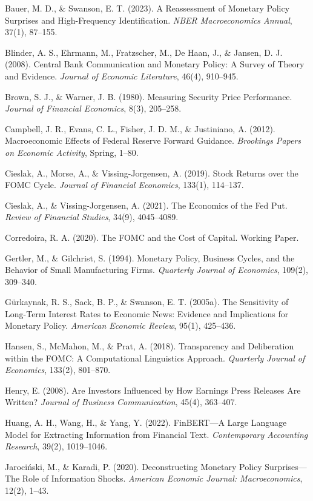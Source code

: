 \documentclass[12pt]{article}
\begin{document}
Bauer, M. D., & Swanson, E. T. (2023). A Reassessment of Monetary Policy Surprises and High-Frequency Identification. \textit{NBER Macroeconomics Annual}, 37(1), 87–155.

Blinder, A. S., Ehrmann, M., Fratzscher, M., De Haan, J., & Jansen, D. J. (2008). Central Bank Communication and Monetary Policy: A Survey of Theory and Evidence. \textit{Journal of Economic Literature}, 46(4), 910–945.

Brown, S. J., & Warner, J. B. (1980). Measuring Security Price Performance. \textit{Journal of Financial Economics}, 8(3), 205–258.

Campbell, J. R., Evans, C. L., Fisher, J. D. M., & Justiniano, A. (2012). Macroeconomic Effects of Federal Reserve Forward Guidance. \textit{Brookings Papers on Economic Activity}, Spring, 1–80.

Cieslak, A., Morse, A., & Vissing-Jorgensen, A. (2019). Stock Returns over the FOMC Cycle. \textit{Journal of Financial Economics}, 133(1), 114–137.

Cieslak, A., & Vissing-Jorgensen, A. (2021). The Economics of the Fed Put. \textit{Review of Financial Studies}, 34(9), 4045–4089.

Corredoira, R. A. (2020). The FOMC and the Cost of Capital. Working Paper.

Gertler, M., & Gilchrist, S. (1994). Monetary Policy, Business Cycles, and the Behavior of Small Manufacturing Firms. \textit{Quarterly Journal of Economics}, 109(2), 309–340.

Gürkaynak, R. S., Sack, B. P., & Swanson, E. T. (2005a). The Sensitivity of Long-Term Interest Rates to Economic News: Evidence and Implications for Monetary Policy. \textit{American Economic Review}, 95(1), 425–436.

Hansen, S., McMahon, M., & Prat, A. (2018). Transparency and Deliberation within the FOMC: A Computational Linguistics Approach. \textit{Quarterly Journal of Economics}, 133(2), 801–870.

Henry, E. (2008). Are Investors Influenced by How Earnings Press Releases Are Written? \textit{Journal of Business Communication}, 45(4), 363–407.

Huang, A. H., Wang, H., & Yang, Y. (2022). FinBERT---A Large Language Model for Extracting Information from Financial Text. \textit{Contemporary Accounting Research}, 39(2), 1019–1046.

Jarociński, M., & Karadi, P. (2020). Deconstructing Monetary Policy Surprises---The Role of Information Shocks. \textit{American Economic Journal: Macroeconomics}, 12(2), 1–43.
\end{document}
